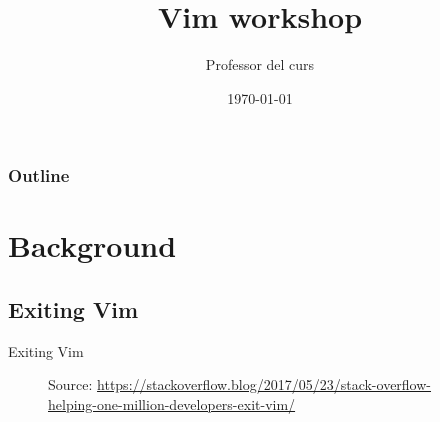 \documentclass{beamer}
\title[Vim workshop]{Vim workshop}
\author{Professor del curs}
\institute[LinuxUPC]
{
  LinuxUPC \\
  \medskip
  \textit{linuxupc AT linuxupc.upc.edu} 
}
\date{\today}
\begin{document}
\begin{frame}
  \titlepage
\end{frame}

\begin{frame}
  \frametitle{Outline} 
  \tableofcontents 
\end{frame}

\section{Background}
\subsection{Exiting Vim}
\begin{frame}{Exiting Vim}
\begin{figure}[htp] 
    \centering
    \hfill%
        \caption{Source: \url{https://stackoverflow.blog/2017/05/23/stack-overflow-helping-one-million-developers-exit-vim/}}
    \end{figure}
\end{frame}
\end{document}
